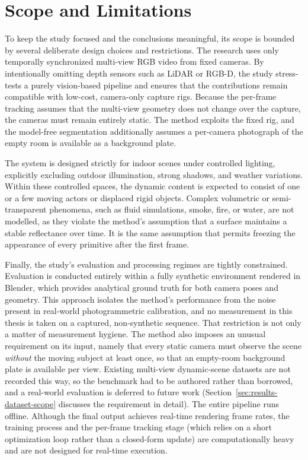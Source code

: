 \section{Scope and Limitations}

To keep the study focused and the conclusions meaningful, its scope is bounded
by several deliberate design choices and restrictions. The research uses only
temporally synchronized multi-view RGB video from fixed cameras. By intentionally omitting depth sensors such as LiDAR or RGB-D, the
study stress-tests a purely vision-based pipeline and ensures that the
contributions remain compatible with low-cost, camera-only capture rigs. Because
the per-frame tracking assumes that the multi-view geometry does not change over
the capture, the cameras must remain entirely static. The method exploits the
fixed rig, and the model-free segmentation additionally assumes a per-camera
photograph of the empty room is available as a background plate.

The system is designed strictly for indoor scenes under controlled lighting,
explicitly excluding outdoor illumination, strong shadows, and weather
variations. Within these controlled spaces, the dynamic content is expected to
consist of one or a few moving actors or displaced rigid objects. Complex
volumetric or semi-transparent phenomena, such as fluid simulations, smoke,
fire, or water, are not modelled, as they violate the method's assumption that a
surface maintains a stable reflectance over time. It is the same assumption
that permits freezing the appearance of every primitive after the first frame.

Finally, the study's evaluation and processing regimes are tightly constrained.
Evaluation is conducted entirely within a fully synthetic environment rendered
in Blender, which provides analytical ground truth for both camera poses and
geometry. This approach isolates the method's performance from the noise present
in real-world photogrammetric calibration, and no measurement in this thesis is
taken on a captured, non-synthetic sequence. That restriction is not only a
matter of measurement hygiene. The method also imposes an unusual requirement on
its input, namely that every static camera must observe the scene \emph{without}
the moving subject at least once, so that an empty-room background plate is
available per view. Existing multi-view dynamic-scene datasets are not recorded
this way, so the benchmark had to be authored rather than borrowed, and a
real-world evaluation is deferred to future work
(Section~\ref{sec:results-dataset-scope} discusses the requirement in detail).
The entire pipeline runs offline. Although the final output achieves real-time
rendering frame rates, the training process and the per-frame tracking stage
(which relies on a short optimization loop rather than a closed-form update) are
computationally heavy and are not designed for real-time execution.

